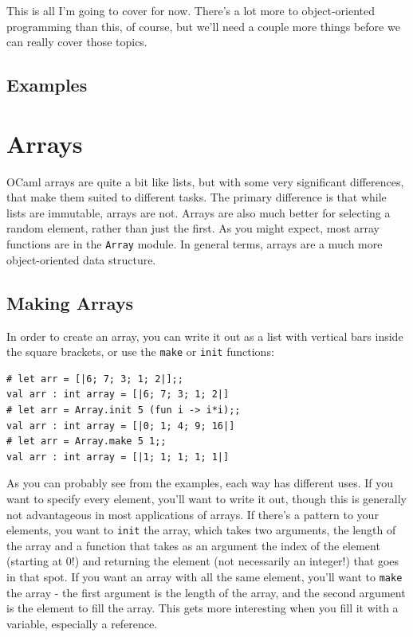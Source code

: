 \documentclass[10pt]{book}
\begin{document}
This is all I'm going to cover for now. There's a lot more to object-oriented 
programming than this, of course, but we'll need a couple more things before
we can really cover those topics.

\section{Examples}


\chapter{Arrays}

OCaml arrays are quite a bit like lists, but with some very significant
differences, that make them suited to different tasks. The primary difference
is that while lists are immutable, arrays are not. Arrays are also much better
for selecting a random element, rather than just the first. As you might expect,
most array functions are in the {\tt Array} module. In general terms, arrays are 
a much more object-oriented data structure.

\section{Making Arrays}

In order to create an array, you can write it out as a list with vertical bars inside the square brackets, or use the {\tt make} or {\tt init} functions:

\beforeverb
\begin{verbatim}
# let arr = [|6; 7; 3; 1; 2|];;
val arr : int array = [|6; 7; 3; 1; 2|]
# let arr = Array.init 5 (fun i -> i*i);;
val arr : int array = [|0; 1; 4; 9; 16|]
# let arr = Array.make 5 1;;
val arr : int array = [|1; 1; 1; 1; 1|]
\end{verbatim}
\afterverb
As you can probably see from the examples, each way has different uses. If you want to specify every element, you'll want to write it out, though this is generally not advantageous in most applications of arrays. If there's a pattern to your elements, you want to {\tt init} the array, which takes two arguments, the length of the array and a function that takes as an argument the index of the element (starting at 0!) and returning the element (not necessarily an integer!) that goes in that spot. If you want an array with all the same element, you'll want to {\tt make} the array - the first argument is the length of the array, and the second argument is the element to fill the array. This gets more interesting when you fill it with a variable, especially a reference.
\end{document}
